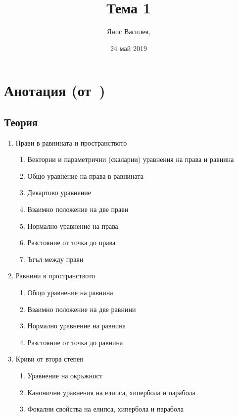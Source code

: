 \documentclass[numbers=endperiod, DIV=15]{scrartcl}
\title{Тема 1}
\author{Янис Василев, \Email{ianis@ivasilev.net}}
\date{24 май 2019}
\begin{document}
\maketitle

\section{Анотация (от~\cite{Syllabus})}

\subsection{Теория}

\begin{enumerate}
  \item Прави в равнината и пространството
  \begin{enumerate}
    \item Векторни и параметрични (скаларни) уравнения на права и равнина
    \item Общо уравнение на права в равнината
    \item Декартово уравнение
    \item Взаимно положение на две прави
    \item Нормално уравнение на права
    \item Разстояние от точка до права
    \item Ъгъл между прави
  \end{enumerate}

  \item Равнини в пространството
  \begin{enumerate}
    \item Общо уравнение на равнина
    \item Взаимно положение на две равнини
    \item Нормално уравнение на равнина
    \item Разстояние от точка до равнина
  \end{enumerate}

  \item Криви от втора степен
  \begin{enumerate}
    \item Уравнение на окръжност
    \item Канонични уравнения на елипса, хипербола и парабола
    \item Фокални свойства на елипса, хипербола и парабола
  \end{enumerate}
\end{enumerate}
\end{document}
